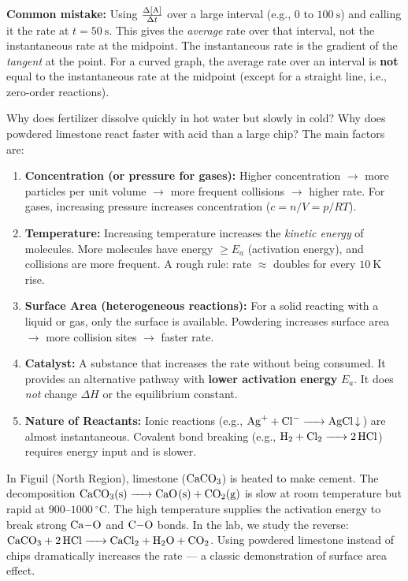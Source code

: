 \documentclass[11pt]{article}
\newcounter{popsec}
\newcounter{popsub}
\newcommand{\courssub}[1]{%
  \stepcounter{popsub}%
  \par\vspace{9pt}\noindent{\popxbold\fontsize{11.5}{13}\selectfont\color{popink}{\color{poporange}\thepopsec.\thepopsub}\hspace{6pt}#1}\par\nopagebreak\vspace{4pt}
}
\begin{document}
\begin{attention}
\textbf{Common mistake:} Using $\frac{\Delta[\ce{A}]}{\Delta t}$ over a large interval (e.g., $0$ to $100\ \mathrm{s}$) and calling it the rate at $t=50\ \mathrm{s}$. This gives the \emph{average} rate over that interval, not the instantaneous rate at the midpoint. The instantaneous rate is the gradient of the \emph{tangent} at the point. For a curved graph, the average rate over an interval is \textbf{not} equal to the instantaneous rate at the midpoint (except for a straight line, i.e., zero-order reactions).
\end{attention}

\courssub{Factors Affecting the Rate of Reaction}

Why does fertilizer dissolve quickly in hot water but slowly in cold? Why does powdered limestone react faster with acid than a large chip? The main factors are:

\begin{enumerate}
\item \textbf{Concentration (or pressure for gases):} Higher concentration $\rightarrow$ more particles per unit volume $\rightarrow$ more frequent collisions $\rightarrow$ higher rate. For gases, increasing pressure increases concentration ($c = n/V = p/RT$).
\item \textbf{Temperature:} Increasing temperature increases the \emph{kinetic energy} of molecules. More molecules have energy $\ge E_a$ (activation energy), and collisions are more frequent. A rough rule: rate $\approx$ doubles for every $10\ \mathrm{K}$ rise.
\item \textbf{Surface Area (heterogeneous reactions):} For a solid reacting with a liquid or gas, only the surface is available. Powdering increases surface area $\rightarrow$ more collision sites $\rightarrow$ faster rate.
\item \textbf{Catalyst:} A substance that increases the rate without being consumed. It provides an alternative pathway with \textbf{lower activation energy} $E_a$. It does \emph{not} change $\Delta H$ or the equilibrium constant.
\item \textbf{Nature of Reactants:} Ionic reactions (e.g., $\ce{Ag+ + Cl- -> AgCl v}$) are almost instantaneous. Covalent bond breaking (e.g., $\ce{H2 + Cl2 -> 2HCl}$) requires energy input and is slower.
\end{enumerate}

\begin{savaistu}
In Figuil (North Region), limestone ($\ce{CaCO3}$) is heated to make cement. The decomposition $\ce{CaCO3(s) -> CaO(s) + CO2(g)}$ is slow at room temperature but rapid at $900\text{--}1000\ \mathrm{^\circ C}$. The high temperature supplies the activation energy to break strong $\ce{Ca-O}$ and $\ce{C-O}$ bonds. In the lab, we study the reverse: $\ce{CaCO3 + 2HCl -> CaCl2 + H2O + CO2}$. Using powdered limestone instead of chips dramatically increases the rate — a classic demonstration of surface area effect.
\end{savaistu}
\end{document}
